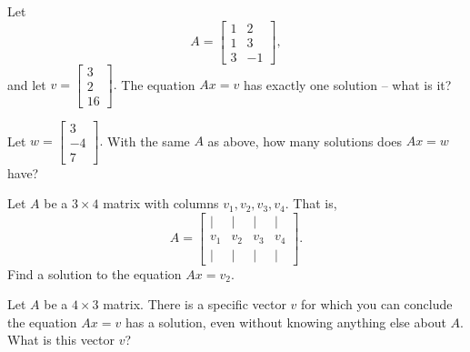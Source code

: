 



Let  \[A = \left[ \begin{array}{cc} 1 & 2  \\ 
1 & 3 \\
3 & -1 \end{array} \right] ,\]
and let $v = \left[\begin{array}{c} 3 \\ 2 \\ 16 
\end{array} \right].$  The equation $Ax = v$ has exactly one solution -- what is it?  




Let $w = \left[\begin{array}{c} 3 \\ -4 \\ 7 
\end{array} \right].$  With the same $A$ as above, how many solutions does $Ax = w$ have?


\edXsolution{ 
}


\endedxproblem





Let $A$ be a $3\times 4$ matrix with columns $v_1, v_2, v_3, v_4$.  That is, 
 \[ A = \left[ \begin{array}{cccc} | & | & | & | \\ 
v_1 & v_2 & v_3 & v_4 \\
 | & | & | & | \end{array} \right]. \]
Find a solution to the equation $Ax = v_2$.   
 



\edXsolution{ 
}


\endedxproblem




Let $A$ be a $4\times 3$ matrix.  There is a specific 
vector $v$ for which you can conclude the equation $Ax = v$ has a solution, even without knowing
anything else about $A$.  What is this vector $v$?  

